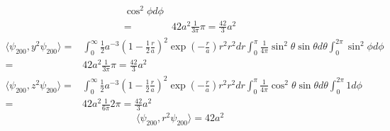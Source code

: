 \begin{enumerate}
\begin{enumerate}
\begin{align*}
        \cos^2\phi d\phi\\
        =&42a^2\frac{1}{3\pi}
        \pi = \frac{42}{3}a^2
    \end{align*}
    \begin{align*}
        \langle\psi_{200},y^2\psi_{200}\rangle=&
        \int_0^\infty 
        \frac{1}{2}a^{-3}\left(
        1-\frac{1}{2}\frac{r}{a}
        \right)^2
        \exp(-\frac{r}{a})r^2r^2
        dr\int_0^\pi \frac{1}{4\pi}\sin^2\theta\sin\theta d\theta \int_0^{2\pi}
        \sin^2\phi d\phi\\
        =&42a^2\frac{1}{3\pi}
        \pi = \frac{42}{3}a^2
    \end{align*}
    \begin{align*}
        \langle\psi_{200},z^2\psi_{200}\rangle=&
        \int_0^\infty 
        \frac{1}{2}a^{-3}\left(
        1-\frac{1}{2}\frac{r}{a}
        \right)^2
        \exp(-\frac{r}{a})r^2r^2
        dr\int_0^\pi 
        \frac{1}{4\pi}\cos^2\theta\sin\theta d\theta \int_0^{2\pi}
        1 d\phi\\
        =&42a^2\frac{1}{6\pi}
        2\pi = \frac{42}{3}a^2
    \end{align*}
    $$
    \langle\psi_{200},r^2\psi_{200}\rangle=42a^2
    $$


\end{enumerate}
\end{enumerate}
